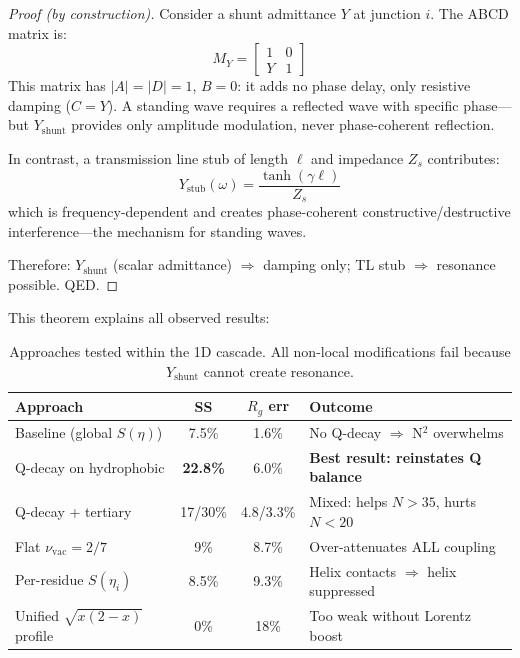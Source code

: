 \begin{proof}[Proof (by construction)]
Consider a shunt admittance $Y$ at junction $i$.  The ABCD matrix is:
\begin{equation}
    M_Y = \begin{bmatrix} 1 & 0 \\ Y & 1 \end{bmatrix}
\end{equation}
This matrix has $|A| = |D| = 1$, $B = 0$: it adds no phase delay, only resistive damping ($C = Y$).  A standing wave requires a reflected wave with specific phase---but $Y_\text{shunt}$ provides only amplitude modulation, never phase-coherent reflection.

In contrast, a transmission line stub of length $\ell$ and impedance $Z_s$ contributes:
\begin{equation}
    Y_\text{stub}(\omega) = \frac{\tanh(\gamma\ell)}{Z_s}
\end{equation}
which is frequency-dependent and creates phase-coherent constructive/destructive interference---the mechanism for standing waves.

Therefore: $Y_\text{shunt}$ (scalar admittance) $\Rightarrow$ damping only; TL stub $\Rightarrow$ resonance possible.  QED.
\end{proof}

\noindent This theorem explains all observed results:

\begin{table}[H]
\centering
\caption{Approaches tested within the 1D cascade.  All non-local modifications fail because $Y_\text{shunt}$ cannot create resonance.}
\label{tab:ceiling_evidence}
\begin{tabular}{@{}l cc l@{}}
\toprule
\textbf{Approach} & \textbf{SS} & \textbf{$R_g$ err} & \textbf{Outcome} \\
\midrule
Baseline (global $S(\eta)$)       & 7.5\%  & 1.6\%  & No Q-decay $\Rightarrow$ N$^2$ overwhelms \\
Q-decay on hydrophobic            & \textbf{22.8\%} & 6.0\%  & \textbf{Best result: reinstates Q balance} \\
Q-decay + tertiary                & 17/30\%  & 4.8/3.3\%  & Mixed: helps $N>35$, hurts $N<20$ \\
Flat $\nu_\text{vac} = 2/7$       & 9\%    & 8.7\%  & Over-attenuates ALL coupling \\
Per-residue $S(\eta_i)$           & 8.5\%  & 9.3\%  & Helix contacts $\Rightarrow$ helix suppressed \\
Unified $\sqrt{x(2-x)}$ profile  & 0\%    & 18\%   & Too weak without Lorentz boost \\
\bottomrule
\end{tabular}
\end{table}

